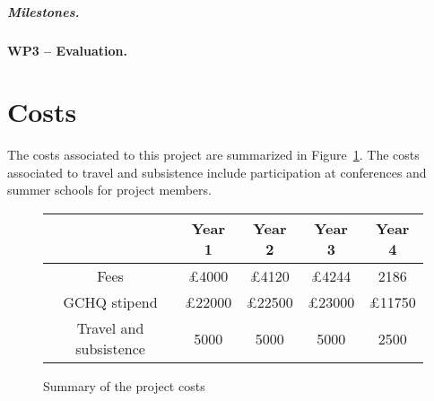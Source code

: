 \documentclass[10pt]{article}
\begin{document}
\subparagraph{Milestones.}



\paragraph{WP3 -- Evaluation.}  














\section{Costs}
The costs associated to this project are summarized in Figure~\ref{fig:costs}.  
The costs associated to travel and subsistence include participation at conferences and summer schools for project members.

\begin{figure}[h!t]
\begin{center}
\begin{tabular}{|c|c|c|c|c|}
\hline 
& {\bf Year 1} &{\bf Year 2}&{\bf Year 3}&{\bf Year 4}\\
\hline
Fees & £4000 & £4120 & £4244 & 2186 \\
\hline
GCHQ stipend & £22000 & £22500 & £23000 & £11750 \\
\hline
Travel and subsistence & 5000 & 5000 & 5000 & 2500 \\
\hline
\end{tabular}
\end{center}
\caption{Summary of the project costs}
\label{fig:costs}
\end{figure}

%
%
%
%
\small


\end{document}
